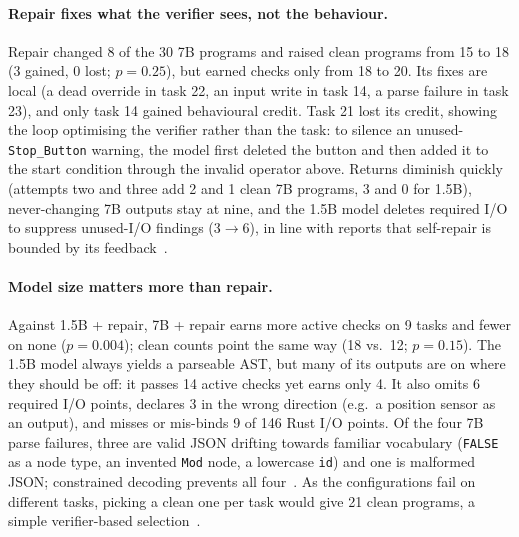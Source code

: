 \documentclass{ceurart}
\begin{document}
\paragraph{Repair fixes what the verifier sees, not the behaviour.}
Repair changed 8 of the 30 7B programs and raised clean programs from 15 to 18 (3 gained, 0 lost; $p=0.25$), but earned checks only from 18 to 20. Its fixes are local (a dead override in task 22, an input write in task 14, a parse failure in task 23), and only task 14 gained behavioural credit. Task 21 lost its credit, showing the loop optimising the verifier rather than the task: to silence an unused-\texttt{Stop\_Button} warning, the model first deleted the button and then added it to the start condition through the invalid operator above. Returns diminish quickly (attempts two and three add 2 and 1 clean 7B programs, 3 and 0 for 1.5B), never-changing 7B outputs stay at nine, and the 1.5B model deletes required I/O to suppress unused-I/O findings (3$\to$6), in line with reports that self-repair is bounded by its feedback~\cite{olausson2024selfrepair,huang2024cannot}.

\paragraph{Model size matters more than repair.}
Against 1.5B + repair, 7B + repair earns more active checks on 9 tasks and fewer on none ($p=0.004$); clean counts point the same way (18 vs.\ 12; $p=0.15$). The 1.5B model always yields a parseable AST, but many of its outputs are on where they should be off: it passes 14 active checks yet earns only 4. It also omits 6 required I/O points, declares 3 in the wrong direction (e.g.\ a position sensor as an output), and misses or mis-binds 9 of 146 Rust I/O points. Of the four 7B parse failures, three are valid JSON drifting towards familiar vocabulary (\texttt{FALSE} as a node type, an invented \texttt{Mod} node, a lowercase \texttt{id}) and one is malformed JSON; constrained decoding prevents all four~\cite{scholak2021picard,poesia2022synchromesh,geng2023gcd,willard2023outlines}. As the configurations fail on different tasks, picking a clean one per task would give 21 clean programs, a simple verifier-based selection~\cite{li2022alphacode,chen2023codet,ni2023lever}.
\end{document}
